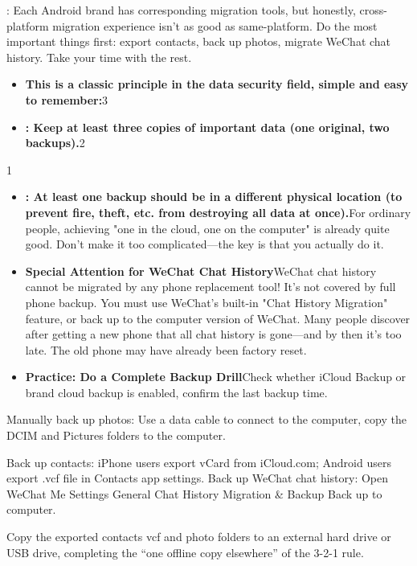 
: Each Android brand has corresponding migration tools, but honestly, cross-platform migration experience isn't as good as same-platform. Do the most important things first: export contacts, back up photos, migrate WeChat chat history. Take your time with the rest.


\begin{itemize}
  \item \textbf{This is a classic principle in the data security field, simple and easy to remember:}3
  \item \textbf{: Keep at least three copies of important data (one original, two backups).}2
\end{itemize}


1

\begin{itemize}
  \item \textbf{: At least one backup should be in a different physical location (to prevent fire, theft, etc. from destroying all data at once).}For ordinary people, achieving "one in the cloud, one on the computer" is already quite good. Don't make it too complicated—the key is that you actually do it.
  \item \textbf{Special Attention for WeChat Chat History}WeChat chat history cannot be migrated by any phone replacement tool! It's not covered by full phone backup. You must use WeChat's built-in "Chat History Migration" feature, or back up to the computer version of WeChat. Many people discover after getting a new phone that all chat history is gone—and by then it's too late. The old phone may have already been factory reset.
  \item \textbf{Practice: Do a Complete Backup Drill}Check whether iCloud Backup or brand cloud backup is enabled, confirm the last backup time.
\end{itemize}

Manually back up photos: Use a data cable to connect to the computer, copy the DCIM and Pictures folders to the computer.

\begin{tcbwarn}{Back up contacts: iPhone users export vCard from iCloud.com; Android users export .vcf file in Contacts app settings.}
Back up WeChat chat history: Open WeChat Me Settings General Chat History Migration \& Backup Back up to computer.

\end{tcbwarn}

Copy the exported contacts vcf and photo folders to an external hard drive or USB drive, completing the “one offline copy elsewhere” of the 3-2-1 rule.
